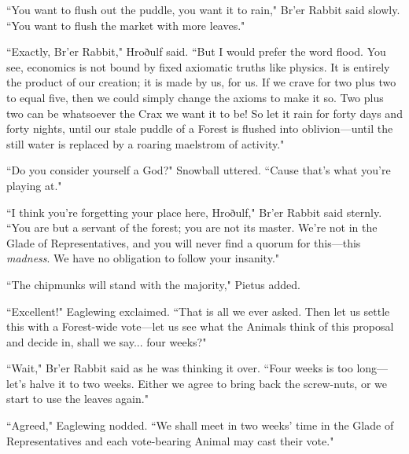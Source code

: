``You want to flush out the puddle, you want it to rain," Br'er Rabbit said slowly.
``You want to flush the market with more leaves."

``Exactly, Br'er Rabbit," Hroðulf said.
``But I would prefer the word flood.
You see, economics is not bound by fixed axiomatic truths like physics.
It is entirely the product of our creation; it is made by us, for us.
If we crave for two plus two to equal five, then we could simply change the axioms to make it so.
Two plus two can be whatsoever the Crax we want it to be!
So let it rain for forty days and forty nights, until our stale puddle of a Forest is flushed into oblivion---until the still water is replaced by a roaring maelstrom of activity."

``Do you consider yourself a God?" Snowball uttered.
``Cause that's what you're playing at."

``I think you're forgetting your place here, Hroðulf," Br'er Rabbit said sternly.
``You are but a servant of the forest; you are not its master.
We're not in the Glade of Representatives, and you will never find a quorum for this---this \textit{madness}.
We have no obligation to follow your insanity."

``The chipmunks will stand with the majority," Pietus added.

``Excellent!" Eaglewing exclaimed.
``That is all we ever asked.
Then let us settle this with a Forest-wide vote---let us see what the Animals think of this proposal and decide in, shall we say... four weeks?"

``Wait," Br'er Rabbit said as he was thinking it over.
``Four weeks is too long---let's halve it to two weeks.
Either we agree to bring back the screw-nuts, or we start to use the leaves again."

``Agreed," Eaglewing nodded.
``We shall meet in two weeks' time in the Glade of Representatives and each vote-bearing Animal may cast their vote."














